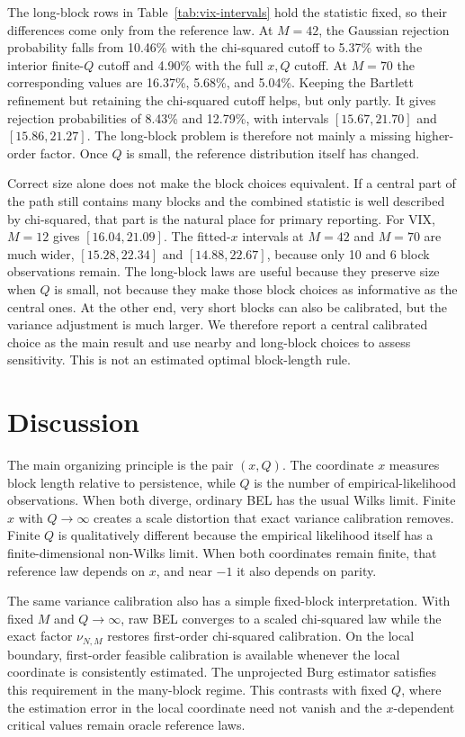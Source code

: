 \documentclass[12pt]{article}
\theoremstyle{remark}
\begin{document}
The long-block rows in Table~\ref{tab:vix-intervals} hold the statistic fixed, so their differences come only from the reference law. At $M=42$, the Gaussian rejection probability falls from 10.46\% with the chi-squared cutoff to 5.37\% with the interior finite-$Q$ cutoff and 4.90\% with the full $x,Q$ cutoff. At $M=70$ the corresponding values are 16.37\%, 5.68\%, and 5.04\%. Keeping the Bartlett refinement but retaining the chi-squared cutoff helps, but only partly. It gives rejection probabilities of 8.43\% and 12.79\%, with intervals $[15.67,21.70]$ and $[15.86,21.27]$. The long-block problem is therefore not mainly a missing higher-order factor. Once $Q$ is small, the reference distribution itself has changed.

Correct size alone does not make the block choices equivalent. If a central part of the path still contains many blocks and the combined statistic is well described by chi-squared, that part is the natural place for primary reporting. For VIX, $M=12$ gives $[16.04,21.09]$. The fitted-$x$ intervals at $M=42$ and $M=70$ are much wider, $[15.28,22.34]$ and $[14.88,22.67]$, because only 10 and 6 block observations remain. The long-block laws are useful because they preserve size when $Q$ is small, not because they make those block choices as informative as the central ones. At the other end, very short blocks can also be calibrated, but the variance adjustment is much larger. We therefore report a central calibrated choice as the main result and use nearby and long-block choices to assess sensitivity. This is not an estimated optimal block-length rule.

\section{Discussion}
The main organizing principle is the pair $(x,Q)$. The coordinate $x$ measures block length relative to persistence, while $Q$ is the number of empirical-likelihood observations. When both diverge, ordinary BEL has the usual Wilks limit. Finite $x$ with $Q\to\infty$ creates a scale distortion that exact variance calibration removes. Finite $Q$ is qualitatively different because the empirical likelihood itself has a finite-dimensional non-Wilks limit. When both coordinates remain finite, that reference law depends on $x$, and near $-1$ it also depends on parity.

The same variance calibration also has a simple fixed-block interpretation. With fixed $M$ and $Q\to\infty$, raw BEL converges to a scaled chi-squared law while the exact factor $\nu_{N,M}$ restores first-order chi-squared calibration. On the local boundary, first-order feasible calibration is available whenever the local coordinate is consistently estimated. The unprojected Burg estimator satisfies this requirement in the many-block regime. This contrasts with fixed $Q$, where the estimation error in the local coordinate need not vanish and the $x$-dependent critical values remain oracle reference laws.
\end{document}
